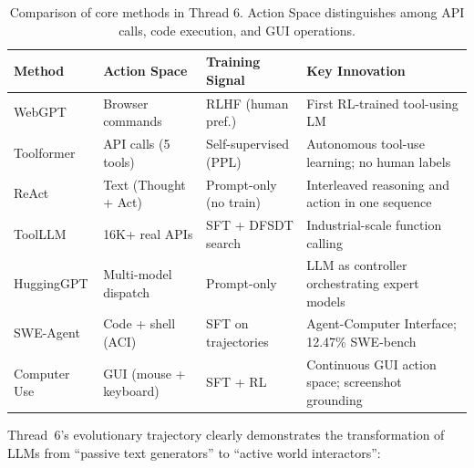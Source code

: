 \begin{table}[!ht]
\centering
\caption{Comparison of core methods in Thread 6. Action Space distinguishes among API calls, code execution, and GUI operations.}
\label{tab:agentic-comparison}
\small
\begin{tabularx}{\textwidth}{l >{\raggedright\arraybackslash}p{2.2cm} >{\raggedright\arraybackslash}p{2.2cm} >{\raggedright\arraybackslash}X}
\toprule
\textbf{Method} & \textbf{Action Space} & \textbf{Training Signal} & \textbf{Key Innovation} \\
\midrule
WebGPT & Browser commands & RLHF (human pref.) & First RL-trained tool-using LM \\
Toolformer & API calls (5 tools) & Self-supervised (PPL) & Autonomous tool-use learning; no human labels \\
ReAct & Text (Thought + Act) & Prompt-only (no train) & Interleaved reasoning and action in one sequence \\
ToolLLM & 16K+ real APIs & SFT + DFSDT search & Industrial-scale function calling \\
HuggingGPT & Multi-model dispatch & Prompt-only & LLM as controller orchestrating expert models \\
SWE-Agent & Code + shell (ACI) & SFT on trajectories & Agent-Computer Interface; 12.47\% SWE-bench \\
Computer Use & GUI (mouse + keyboard) & SFT + RL & Continuous GUI action space; screenshot grounding \\
\bottomrule
\end{tabularx}
\end{table}

Thread~6's evolutionary trajectory clearly demonstrates the transformation of LLMs from ``passive text generators''
to ``active world interactors'':


